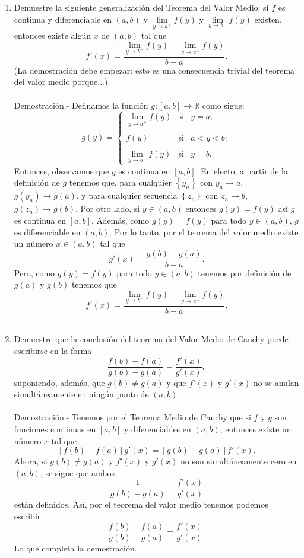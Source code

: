 \begin{enumerate}[\bfseries 1.]
\item Demuestre la siguiente generalización del Teorema del Valor Medio: si $f$ es continua y diferenciable en $(a,b)$ y $\lim\limits_{y\to a^+}f(y)$ y $\lim\limits_{y\to b^-} f(y)$ existen, entonces existe algún $x$ de $(a,b)$ tal que
    $$f'(x)=\dfrac{\lim\limits_{y\to b^-} f(y)-\lim\limits_{y\to a^+}f(y)}{b-a}.$$
    (La demostración debe empezar: esto es una consecuencia trivial del teorema del valor medio porque...).\\\\
	Demostración.-\; Definamos la función $g:[a,b]\to \mathbb{R}$ como sigue:
	$$
	g(y) = 
	    \left\{
		\begin{array}{rcl}
		    \lim\limits_{y\to a^+} f(y)&\mbox{si}& y=a;\\\\
		    f(y)&\mbox{si}& a<y<b;\\\\
		    \lim\limits_{y\to b^-} f(y)&\mbox{si}& y=b.
		\end{array}
	    \right.
	$$
	Entonces, observamos que $g$ es continua en $[a,b]$. En efecto, a partir de la definición de $g$ tenemos que, para cualquier $\left\{y_n\right\}$ con $y_n\to a$, $g(y_n)\to g(a)$, y para cualquier secuencia $\left\{z_n\right\}$ con $z_n\to b,$ $g(z_n)\to g(b)$. Por otro lado, si $y\in (a,b)$ entonces $g(y)=f(y)$ así $g$ es continua en $[a,b]$. Además, como $g(y)=f(y)$ para todo $y\in (a,b)$, $g$ es diferenciable en $(a,b)$. Por lo tanto, por el teorema del valor medio existe un número $x\in (a,b)$ tal que
	$$g'(x)=\dfrac{g(b)-g(a)}{b-a}.$$
	Pero, como $g(y)=f(y)$ para todo $y\in (a,b)$ tenemos por definición de $g(a)$ y $g(b)$ tenemos que
	$$f'(x)=\dfrac{\lim\limits_{y\to b^-}f(y)-\lim\limits_{y\to a^+}f(y)}{b-a}.$$\\

    \item Demuestre que la conclusión del teorema del Valor Medio de Cauchy puede escribirse en la forma
    $$\dfrac{f(b)-f(a)}{g(b)-g(a)}=\dfrac{f'(x)}{g'(x)},$$
    suponiendo, además, que $g(b)\neq g(a)$ y que $f'(x)$ y $g'(x)$ no se anulan simultáneamente en ningún punto de $(a,b)$.\\\\
	Demostración.-\; Tenemos por el Teorema Medio de Cauchy que si $f$ y $g$ son funciones continuas en $[a,b]$ y diferenciables en $(a,b)$, entonces existe un número $x$ tal que
	$$\left[f(b)-f(a)\right]g'(x)=\left[g(b)-g(a)\right]f'(x).$$
	Ahora, si $g(b)\neq g(a)$ y $f'(x)$  y $g'(x)$ no son simultáneamente cero en $(a,b)$, se sigue que ambos 
	$$\dfrac{1}{g(b)-g(a)}\; \quad \dfrac{f'(x)}{g'(x)}$$
	están definidos. Así, por el teorema del valor medio tenemos podemos escribir,
	$$\dfrac{f(b)-f(a)}{g(b)-g(a)}=\dfrac{f'(x)}{g'(x)}.$$
	Lo que completa la demostración.\\\\


\end{enumerate}
